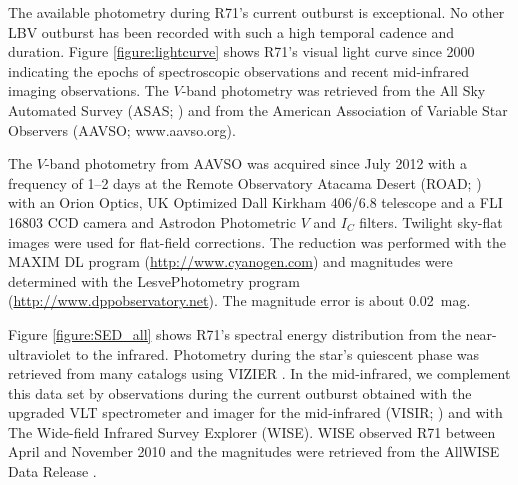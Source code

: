 \documentclass[structabstract]{aa}
\begin{document}
The available photometry during R71's current outburst is exceptional. No other LBV outburst has been recorded with such a high temporal cadence and duration.
Figure \ref{figure:lightcurve} shows R71's visual light curve since 2000 indicating the epochs of spectroscopic observations and recent mid-infrared imaging observations. The $V$-band photometry was retrieved from the All Sky Automated Survey (ASAS; \citealt{1997AcA....47..467P}) and from the American Association of Variable Star Observers (AAVSO; www.aavso.org).

The $V$-band photometry from AAVSO was acquired since July 2012 with a frequency of 1--2 days at the Remote Observatory Atacama Desert (ROAD; \citealt{2012JAVSO..40.1003H}) with an Orion Optics, UK Optimized Dall Kirkham 406/6.8 telescope and a FLI 16803 CCD camera and Astrodon Photometric $V$ and $I_C$ filters.
Twilight sky-flat images were used for flat-field corrections. The reduction was performed with the MAXIM DL program (\url{http://www.cyanogen.com}) and magnitudes were determined with the LesvePhotometry program (\url{http://www.dppobservatory.net}). The magnitude error is about 0.02~mag.

Figure \ref{figure:SED_all} shows R71's spectral energy distribution from the near-ultraviolet to the infrared. Photometry during the star's quiescent phase was retrieved from many catalogs using VIZIER \citep{2000A&AS..143...23O}. In the mid-infrared, we complement this data set by observations during the current outburst obtained with the upgraded VLT spectrometer and imager for the mid-infrared (VISIR; \citealt{2004Msngr.117...12L,2015Msngr.159...15K,2016SPIE.9908E..0DK}) and with The Wide-field Infrared Survey Explorer (WISE). WISE observed R71 between April and November 2010 and the magnitudes were retrieved from the AllWISE Data Release \citep{2013yCat.2328....0C}.
\end{document}
